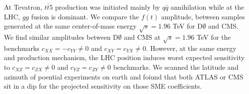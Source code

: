 \documentclass[a4paper,11pt,twoside,french]{article}
\begin{document}
    \begin{multicols}{2}

\vfill\null
\columnbreak
At Tevatron, $t\bar{t}5$ production was initiated mainly by $q\bar{q}$ annihilation while at the LHC, $gg$ fusion is dominant. We compare the $f(t)$ amplitude, between samples generated at the same center-of-mass energy $\sqrt{s} = 1.96$ TeV for D$\emptyset$ and CMS. We find similar amplitudes between D$\emptyset$ and CMS at $\sqrt{s} = 1.96$ TeV for the benchmarks $c_{XX} = -c_{YY} \neq 0$ and $c_{XY} = c_{YX} \neq 0$. However, at the same energy and production mechanism, the LHC position induces worst expected sensitivity to $c_{XZ} = c_{ZX} \neq 0$ and $c_{YZ} = c_{ZY} \neq 0$ benchmarks. We scanned the latitude and azimuth of poential experiments on earth and foiund that both ATLAS or CMS sit in a dip for the projected sensitivity on those SME coefficients.

    \end{multicols}
\end{document}
